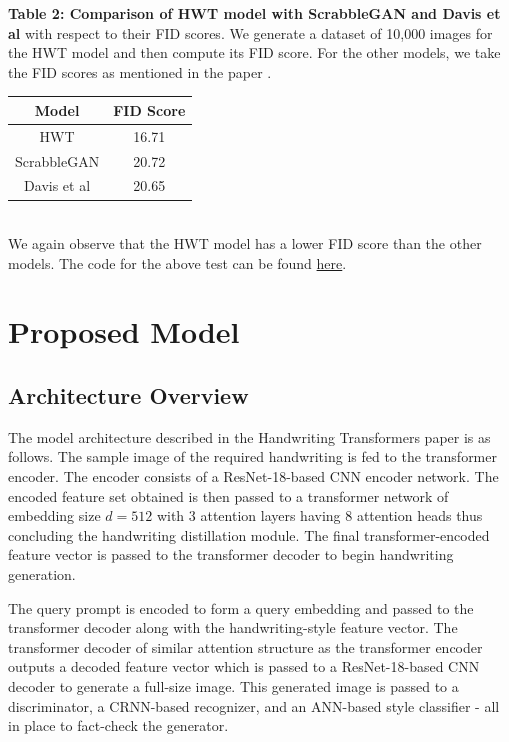 \documentclass[10pt,twocolumn,letterpaper]{article}
\begin{document}
\noindent
\textbf{Table 2: Comparison of HWT model with ScrabbleGAN\cite{fogel2020scrabblegan} and Davis et al\cite{davis2020text}} with respect to their FID scores. We generate a dataset of 10,000 images for the HWT model and then compute its FID score. For the other models, we take the FID scores as mentioned in the paper \cite{HWT}.
\begin{table}[h]
  \begin{center}
    \begin{tabular}{|c|c|}
      \hline
      \textbf{Model} & \textbf{FID Score} \\
      \hline
      HWT & 16.71 \\
      \hline
      ScrabbleGAN & 20.72 \\
      \hline
      Davis et al & 20.65 \\
      \hline
    \end{tabular}
  \end{center}
\end{table} \\
We again observe that the HWT model has a lower FID score than the other models.
The code for the above test can be found \href{https://github.com/Shambu-K/handwriting-generator-model/blob/main/compute-fid-hwt.ipynb}{here}.

\section{Proposed Model}

\subsection{Architecture Overview}

The model architecture described in the Handwriting Transformers paper is as follows. The sample image of the required handwriting is fed to the transformer encoder. The encoder consists of a ResNet-18-based CNN encoder network. The encoded feature set obtained is then passed to a transformer network of embedding size $d = 512$ with 3 attention layers having 8 attention heads thus concluding the handwriting distillation module. The final transformer-encoded feature vector is passed to the transformer decoder to begin handwriting generation.

The query prompt is encoded to form a query embedding and passed to the transformer decoder along with the handwriting-style feature vector. The transformer decoder of similar attention structure as the transformer encoder outputs a decoded feature vector which is passed to a ResNet-18-based CNN decoder to generate a full-size image. This generated image is passed to a discriminator, a CRNN-based recognizer, and an ANN-based style classifier - all in place to fact-check the generator.
\end{document}
